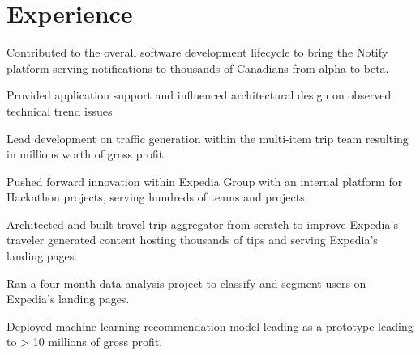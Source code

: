 \documentclass[letterpaper]{deedy-resume} %
\begin{document}
\begin{minipage}[t]{0.66\textwidth} %


\section{Experience}


\vspace{\topsep} %

\begin{tightitemize}
\item Contributed to the overall software development lifecycle to bring the
Notify platform serving notifications to thousands of Canadians from alpha to beta.
\item Provided application support and influenced architectural design on observed 
technical trend issues
\end{tightitemize}

\sectionspace %



\begin{tightitemize}
\item Lead development on traffic generation within the multi-item trip team resulting in millions 
worth of gross profit.
\item Pushed forward innovation within Expedia Group with an internal platform for Hackathon projects, 
serving hundreds of teams and projects.
\item Architected and built travel trip aggregator from scratch to improve Expedia’s traveler 
generated content hosting thousands of tips and serving Expedia's landing pages.
\item Ran a four-month data analysis project to classify and segment users on Expedia’s landing pages.
\item Deployed machine learning recommendation model leading as a prototype leading to > 10 millions
of gross profit.
\end{tightitemize}


\end{minipage}
\end{document}
